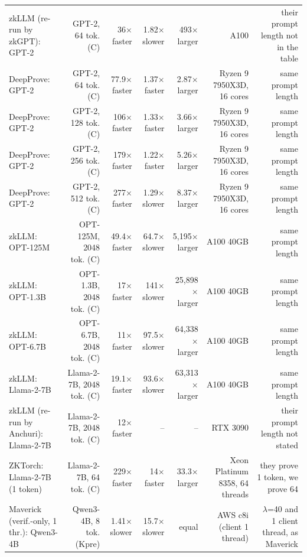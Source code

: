 \begin{tabular}{lrrrrrr}
zkLLM (re-run by zkGPT): GPT-2 & GPT-2, 64 tok. (C) & 36$\times$ faster & 1.82$\times$ slower & 493$\times$ larger & A100 & their prompt length not in the table \\
DeepProve: GPT-2 & GPT-2, 64 tok. (C) & 77.9$\times$ faster & 1.37$\times$ faster & 2.87$\times$ larger & Ryzen 9 7950X3D, 16 cores & same prompt length \\
DeepProve: GPT-2 & GPT-2, 128 tok. (C) & 106$\times$ faster & 1.33$\times$ faster & 3.66$\times$ larger & Ryzen 9 7950X3D, 16 cores & same prompt length \\
DeepProve: GPT-2 & GPT-2, 256 tok. (C) & 179$\times$ faster & 1.22$\times$ faster & 5.26$\times$ larger & Ryzen 9 7950X3D, 16 cores & same prompt length \\
DeepProve: GPT-2 & GPT-2, 512 tok. (C) & 277$\times$ faster & 1.29$\times$ slower & 8.37$\times$ larger & Ryzen 9 7950X3D, 16 cores & same prompt length \\
zkLLM: OPT-125M & OPT-125M, 2048 tok. (C) & 49.4$\times$ faster & 64.7$\times$ slower & 5,195$\times$ larger & A100 40GB & same prompt length \\
zkLLM: OPT-1.3B & OPT-1.3B, 2048 tok. (C) & 17$\times$ faster & 141$\times$ slower & 25,898$\times$ larger & A100 40GB & same prompt length \\
zkLLM: OPT-6.7B & OPT-6.7B, 2048 tok. (C) & 11$\times$ faster & 97.5$\times$ slower & 64,338$\times$ larger & A100 40GB & same prompt length \\
zkLLM: Llama-2-7B & Llama-2-7B, 2048 tok. (C) & 19.1$\times$ faster & 93.6$\times$ slower & 63,313$\times$ larger & A100 40GB & same prompt length \\
zkLLM (re-run by Anchuri): Llama-2-7B & Llama-2-7B, 2048 tok. (C) & 12$\times$ faster & – & – & RTX 3090 & their prompt length not stated \\
ZKTorch: Llama-2-7B (1 token) & Llama-2-7B, 64 tok. (C) & 229$\times$ faster & 14$\times$ faster & 33.3$\times$ larger & Xeon Platinum 8358, 64 threads & they prove 1 token, we prove 64 \\
Maverick (verif.-only, 1 thr.): Qwen3-4B & Qwen3-4B, 8 tok. (Kpre) & 1.41$\times$ slower & 15.7$\times$ slower & equal & AWS c8i (client 1 thread) & $\lambda$=40 and 1 client thread, as Maverick \\
\bottomrule
\end{tabular}

